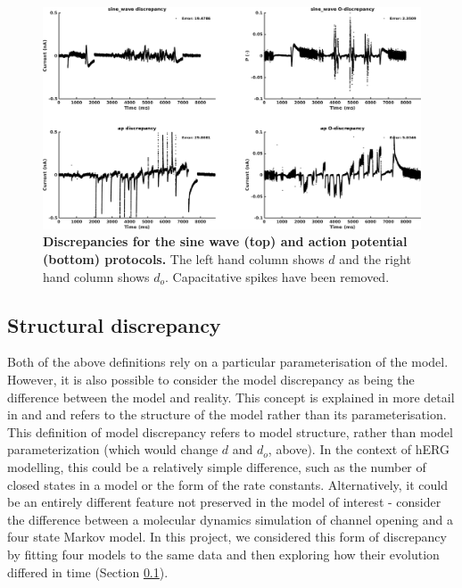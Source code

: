 \documentclass[11pt,a4paper,oneside]{article}
\begin{document}
{\begin{figure}[t]
\begin{center}
\includegraphics[scale=0.42]{Figures/PlotDiscrepancyVsDiscrepancyInOpen_sine_wave_ap.png}
\caption{\textbf{Discrepancies for the sine wave (top) and action potential (bottom) protocols.} The left hand column shows $d$ and the right hand column shows $d_o$. Capacitative spikes have been removed.}
\label{Fig_Discrepancy}
\end{center}
\end{figure}


\subsection{Structural discrepancy}
Both of the above definitions rely on a particular parameterisation of the model. However, it is also possible to consider the model discrepancy as being the difference between the model and reality. This concept is explained in more detail in \cite{Kennedy2001} and \cite{Strong2014} and refers to the structure of the model rather than its parameterisation.  This definition of model discrepancy refers to model structure, rather than model parameterization (which would change $d$ and $d_o$, above). In the context of hERG modelling, this could be a relatively simple difference, such as the number of closed states in a model or the form of the rate constants. Alternatively, it could be an entirely different feature not preserved in the model of interest - consider the difference between a molecular dynamics simulation of channel opening and a four state Markov model. In this project, we considered this form of discrepancy by fitting four models to the same data and then exploring how their evolution differed in time (Section \ref{}).

}
\end{document}
